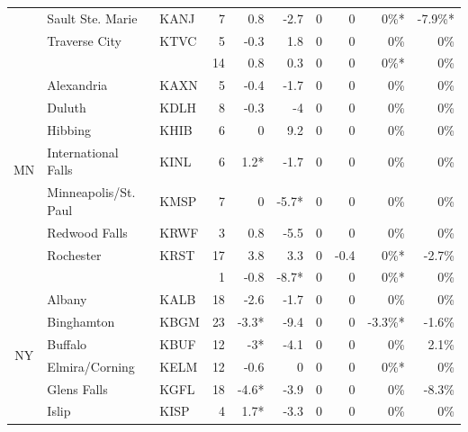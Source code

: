 \documentclass[twocol]{ametsoc}
\begin{document}
\begin{landscape}
\begin{table}[]
\begin{tabular}{cllrrrrrrr}
                     & Sault Ste. Marie           & KANJ & 7    & 0.8   & -2.7  & 0     & 0    & 0\%*    & -7.9\%*  \\
                     & Traverse City              & KTVC & 5    & -0.3  & 1.8   & 0     & 0    & 0\%     & 0\%      \\ \cline{2-10} 
                     &                            &      & 14   & 0.8   & 0.3   & 0     & 0    & 0\%*    & 0\%      \\ \hline
\multirow{7}{*}{MN}  & Alexandria                 & KAXN & 5    & -0.4  & -1.7  & 0     & 0    & 0\%     & 0\%      \\
                     & Duluth                     & KDLH & 8    & -0.3  & -4    & 0     & 0    & 0\%     & 0\%      \\
                     & Hibbing                    & KHIB & 6    & 0     & 9.2   & 0     & 0    & 0\%     & 0\%      \\
                     & International Falls        & KINL & 6    & 1.2*  & -1.7  & 0     & 0    & 0\%     & 0\%      \\
                     & Minneapolis/St. Paul       & KMSP & 7    & 0     & -5.7* & 0     & 0    & 0\%     & 0\%      \\
                     & Redwood Falls              & KRWF & 3    & 0.8   & -5.5  & 0     & 0    & 0\%     & 0\%      \\
                     & Rochester                  & KRST & 17   & 3.8   & 3.3   & 0     & -0.4 & 0\%*    & -2.7\%   \\ \cline{2-10} 
                     &                            &      & 1    & -0.8  & -8.7* & 0     & 0    & 0\%*    & 0\%      \\ \hline
\multirow{15}{*}{NY} & Albany                     & KALB & 18   & -2.6  & -1.7  & 0     & 0    & 0\%     & 0\%      \\
                     & Binghamton                 & KBGM & 23   & -3.3* & -9.4  & 0     & 0    & -3.3\%* & -1.6\%   \\
                     & Buffalo                    & KBUF & 12   & -3*   & -4.1  & 0     & 0    & 0\%     & 2.1\%    \\
                     & Elmira/Corning             & KELM & 12   & -0.6  & 0     & 0     & 0    & 0\%*    & 0\%      \\
                     & Glens Falls                & KGFL & 18   & -4.6* & -3.9  & 0     & 0    & 0\%     & -8.3\%   \\
                     & Islip                      & KISP & 4    & 1.7*  & -3.3  & 0     & 0    & 0\%     & 0\%      \\

\end{tabular}
\end{table}
\end{landscape}
\end{document}
